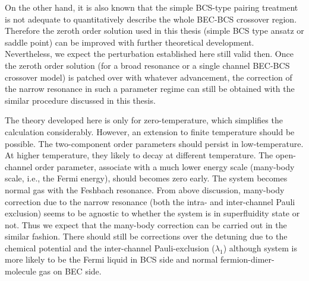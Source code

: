        On the other hand, it is also known that the simple BCS-type pairing treatment is not adequate  to quantitatively describe the whole BEC-BCS crossover region.  Therefore the zeroth order solution used in this thesis (simple BCS type ansatz or saddle point) can be improved with further theoretical development.  Nevertheless, we expect the perturbation established here still valid then.  Once the zeroth order solution (for a broad resonance or a single channel BEC-BCS crossover model) is patched over with whatever advancement, the correction of the narrow resonance in such a parameter regime can still be obtained with the similar procedure discussed in this thesis.  
       
       
\begin{unsure}
The theory developed here is only for zero-temperature, which simplifies the calculation considerably.  However, an extension to finite temperature should be possible.  The two-component order parameters should persist in low-temperature.  At higher temperature, they likely to decay at different temperature.  The open-channel order parameter, associate with a much lower energy scale (many-body scale, i.e., the Fermi energy), should becomes zero early.  The system becomes normal gas with the Feshbach resonance.  From above discussion, many-body correction due to the narrow resonance (both the intra- and inter-channel Pauli exclusion) seems to be agnostic to whether the system is in superfluidity state or not.  Thus we expect that the many-body correction can be carried out in the similar fashion.   There should still be corrections over the detuning due to the chemical potential and the  inter-channel Pauli-exclusion ($\lambda_{1}$) although system is more likely to be the Fermi liquid in BCS side and normal fermion-dimer-molecule gas on BEC side.   
\end{unsure}
